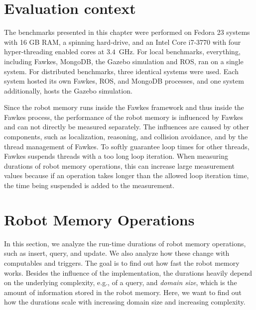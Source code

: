 \section{Evaluation context}
\label{sec:eval-context}
The benchmarks presented in this chapter were performed on Fedora 23
systems with 16 GB RAM, a spinning hard-drive, and an Intel Core i7-3770
with four hyper-threading enabled cores at
$3.4$~GHz. For local benchmarks, everything, including Fawkes, MongoDB,
the Gazebo simulation and ROS, ran on a single system. For distributed
benchmarks, three identical systems were used. Each system hosted its
own Fawkes, ROS, and MongoDB processes, and one system additionally,
hosts the Gazebo simulation.

Since the robot memory runs inside the Fawkes framework and thus
inside the Fawkes process, the performance of the robot memory is
influenced by Fawkes and can not directly be measured separately. The
influences are caused by other components, such as localization,
reasoning, and collision avoidance, and by the thread management of
Fawkes. To softly guarantee loop times for other threads, Fawkes
suspends threads with a too long loop iteration. When measuring
durations of robot memory operations, this can increase large
measurement values because if an operation takes longer than the
allowed loop iteration time, the time being suspended is added to the
measurement.

\section{Robot Memory Operations}
\label{sec:op-durations}
In this section, we analyze the run-time durations of robot memory
operations, such as insert, query, and update. We also analyze how
these change with computables and triggers. The goal is to find out
how fast the robot memory works. Besides the influence of the
implementation, the durations heavily depend on the underlying
complexity, e.g., of a query, and \emph{domain size}, which is the
amount of information stored in the robot memory. Here, we want to
find out how the durations scale with increasing domain size and
increasing complexity.

